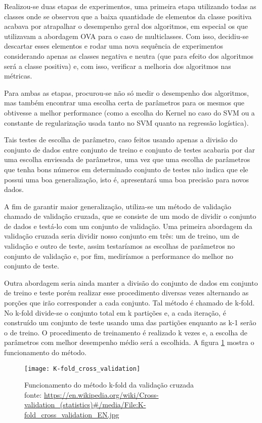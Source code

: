 Realizou-se duas etapas de experimentos, uma primeira etapa utilizando todas as classes onde se
observou que a baixa quantidade de elementos da classe positiva acabava por atrapalhar o desempenho
geral dos algoritmos, em especial os que utilizavam a abordagem OVA para o caso de multiclasses.
Com isso, decidiu-se descartar esses elementos e rodar uma nova sequência de experimentos 
considerando apenas as classes negativa e neutra (que para efeito dos algoritmos será a classe 
positiva) e, com isso, verificar a melhoria dos algoritmos nas métricas.

Para ambas as etapas, procurou-se não só medir o desempenho dos algoritmos, mas também encontrar
uma escolha certa de parâmetros para os mesmos que obtivesse a melhor performance (como a escolha
do Kernel no caso do SVM ou a constante de regularização usada tanto no SVM quanto na regressão
logística).

Tais testes de escolha de parâmetro, caso feitos usando apenas a divisão do conjunto de dados entre
conjunto de treino e conjunto de testes acabaria por dar uma escolha enviesada de parâmetros, uma
vez que uma escolha de parâmetros que tenha bons números em determinado conjunto de testes não
indica que ele possui uma boa generalização, isto é, apresentará uma boa precisão para novos dados.

A fim de garantir maior generalização, utiliza-se um método de validação chamado de 
validação cruzada, que se consiste de um modo de dividir o conjunto de dados e testá-lo com
um conjunto de validação. Uma primeira abordagem da validação cruzada seria dividir nosso conjunto
em três: um de treino, um de validação e outro de teste, assim testaríamos as escolhas de parâmetros
no conjunto de validação e, por fim, mediríamos a performance do melhor no conjunto de teste.

Outra abordagem seria ainda manter a divisão do conjunto de dados em conjunto de treino e teste
porém realizar esse procedimento diversas vezes alternando as porções que irão corresponder a
cada conjunto. Tal método é chamado de k-fold. No k-fold divide-se o conjunto total em k partições
e, a cada iteração, é construído um conjunto de teste usando uma das partições enquanto as k-1
serão o de treino. O procedimento de treinamento é realizado k vezes e, a escolha de parâmetros
com melhor desempenho médio será a escolhida. A figura \ref{fig:kfold} mostra o funcionamento do
método.

\begin{figure}[H]
	\begin{center}
		\texttt{[image: K-fold\_cross\_validation]}
	\end{center}		
	\caption{Funcionamento do método k-fold da validação cruzada \\
		fonte: \url{https://en.wikipedia.org/wiki/Cross-validation_(statistics)\#/media/File:K-fold_cross_validation_EN.jpg}}
	\label{fig:kfold}
\end{figure}

